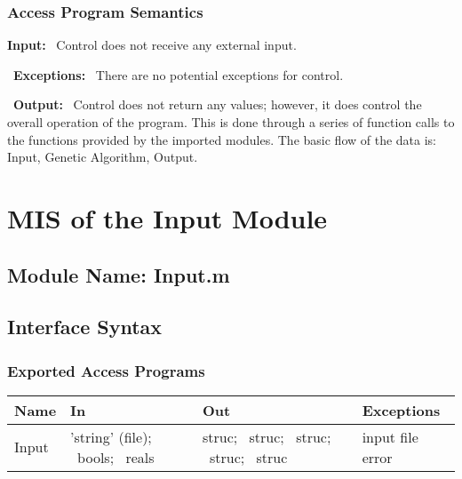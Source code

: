 \documentclass[12pt]{article}
\begin{document}
\subsubsection{Access Program Semantics}

\textbf{Input:} ~\newline Control does not receive any external input.

~\newline\noindent \textbf{Exceptions:} ~\newline There are no
potential exceptions for control.

~\newline\noindent \textbf{Output:} ~\newline Control does not return
any values; however, it does control the overall operation of the
program. This is done through a series of function calls to the
functions provided by the imported modules.  The basic flow of the
data is: Input, Genetic Algorithm, Output.


\section{MIS of the Input Module} \label{sec:InputMod}

\subsection{Module Name: Input.m }

\subsection{Interface Syntax}

\subsubsection{Exported Access Programs}
\begin{center}
\renewcommand*{\arraystretch}{1.5}
\begin{tabular}{| p{} | p{} | 
p{} | p{} |} \hline 

  \textbf{Name} & \textbf{In} & \textbf{Out} & \textbf{Exceptions}
  \\ \hline

   Input & 'string' (file); ~\newline bools; ~\newline reals & struc;
   ~\newline struc; ~\newline struc; ~\newline struc; ~\newline struc
   & input file error \\ \hline

\end{tabular}
\end{center}
\end{document}
